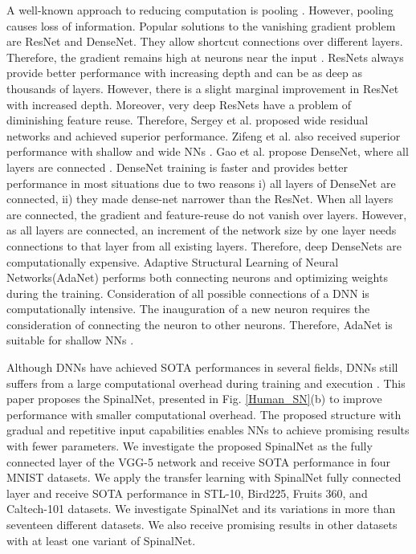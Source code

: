 \documentclass[journal]{IEEEtran}
\begin{document}
A well-known approach to reducing computation is pooling \cite{lawrence1997face}. However, pooling causes loss of information. 
Popular solutions to the vanishing gradient problem are ResNet and DenseNet. They allow shortcut connections over different layers. Therefore, the gradient remains high at neurons near the input \cite{he2016deep}. ResNets always provide better performance with increasing depth and can be as deep as thousands of layers. However, there is a slight marginal improvement in ResNet with increased depth. Moreover, very deep ResNets have a problem of diminishing feature reuse. Therefore, Sergey et al. proposed wide residual networks \cite{zagoruyko2016wide } and achieved superior performance.  Zifeng et al. also received superior performance with shallow and wide NNs \cite{wu2019wider}. Gao et al. propose DenseNet, where all layers are connected \cite{huang2017densely}. DenseNet training is faster and provides better performance in most situations due to two reasons i) all layers of DenseNet are connected, ii) they made dense-net narrower than the ResNet. When all layers are connected, the gradient and feature-reuse do not vanish over layers.  However, as all layers are connected, an increment of the network size by one layer needs connections to that layer from all existing layers. Therefore, deep DenseNets are computationally expensive. Adaptive Structural Learning of Neural Networks(AdaNet) performs both connecting neurons and optimizing weights during the training. Consideration of all possible connections of a DNN is computationally intensive. The inauguration of a new neuron requires the consideration of connecting the neuron to other neurons. Therefore, AdaNet is suitable for shallow NNs \cite{cortes2017adanet, kabir2019partial}. 


Although DNNs have achieved SOTA performances in several fields, DNNs still suffers from a large computational overhead during training and execution \cite{jalali2019optimal}. This paper proposes the SpinalNet, presented in Fig. \ref{Human_SN}(b) to improve performance with smaller computational overhead. The proposed structure with gradual and repetitive input capabilities enables NNs to achieve promising results with fewer parameters. We investigate the proposed SpinalNet as the fully connected layer of the VGG-5 network and receive SOTA performance in four MNIST datasets. We apply the transfer learning with SpinalNet fully connected layer and receive SOTA performance in STL-10, Bird225, Fruits 360, and Caltech-101 datasets. We investigate SpinalNet and its variations in more than seventeen different datasets. We also receive promising results in other datasets with at least one variant of SpinalNet.
\end{document}
